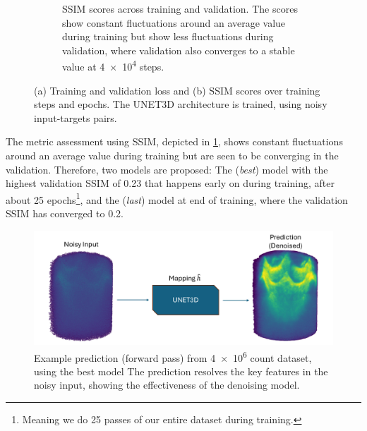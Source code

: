 \begin{figure}
\begin{subfigure}[t]{0.49\linewidth}
        \caption{\gls{SSIM} scores across training and validation. The scores show constant fluctuations around an average value during training but show less fluctuations during validation, where validation also converges to a stable value at \num{4e4} steps.}
        \label{fig:ssim-training-val}
    \end{subfigure}
    \caption{(a) Training and validation loss and (b) \gls{SSIM} scores over training steps and epochs. The UNET3D architecture is trained, using noisy input-targets pairs.}
    \label{fig:loss-ssim-training-val}
\end{figure}

The metric assessment using \gls{SSIM}, depicted in \cref{fig:ssim-training-val}, shows constant fluctuations around an average value during training but are seen to be converging in the validation. Therefore, two models are proposed: The (\textit{best}) model with the highest validation \gls{SSIM} of \num{0.23} that happens early on during training, after about \num{25} epochs\footnote{Meaning we do \num{25} passes of our entire dataset during training.}, and the (\textit{last}) model at end of training, where the validation \gls{SSIM} has converged to \num{0.2}.

\begin{figure}
    \centering
    \includegraphics[width=1\linewidth]{images/noisy_denoised_3d.pdf}
    \caption{Example prediction (forward pass) from \num{4e6} count dataset, using the best model The prediction resolves the key features in the noisy input, showing the effectiveness of the denoising model.}
    \label{fig:3d-image-noisy-denoised-training}
\end{figure}

